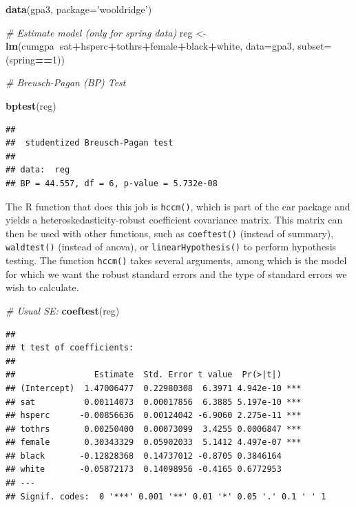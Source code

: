 \documentclass[]{book}
\newenvironment{Shaded}{\begin{snugshade}}{\end{snugshade}}
\newcommand{\CommentTok}[1]{\textcolor[rgb]{0.56,0.35,0.01}{\textit{#1}}}
\newcommand{\DataTypeTok}[1]{\textcolor[rgb]{0.13,0.29,0.53}{#1}}
\newcommand{\DecValTok}[1]{\textcolor[rgb]{0.00,0.00,0.81}{#1}}
\newcommand{\KeywordTok}[1]{\textcolor[rgb]{0.13,0.29,0.53}{\textbf{#1}}}
\newcommand{\NormalTok}[1]{#1}
\newcommand{\OperatorTok}[1]{\textcolor[rgb]{0.81,0.36,0.00}{\textbf{#1}}}
\newcommand{\StringTok}[1]{\textcolor[rgb]{0.31,0.60,0.02}{#1}}
\begin{document}
\begin{Shaded}
\begin{Highlighting}[]
\KeywordTok{data}\NormalTok{(gpa3, }\DataTypeTok{package=}\StringTok{'wooldridge'}\NormalTok{)}


\CommentTok{# Estimate model (only for spring data)}
\NormalTok{reg <-}\StringTok{ }\KeywordTok{lm}\NormalTok{(cumgpa}\OperatorTok{~}\NormalTok{sat}\OperatorTok{+}\NormalTok{hsperc}\OperatorTok{+}\NormalTok{tothrs}\OperatorTok{+}\NormalTok{female}\OperatorTok{+}\NormalTok{black}\OperatorTok{+}\NormalTok{white, }
          \DataTypeTok{data=}\NormalTok{gpa3, }\DataTypeTok{subset=}\NormalTok{(spring}\OperatorTok{==}\DecValTok{1}\NormalTok{))}


\CommentTok{# Breusch-Pagan (BP) Test}

\KeywordTok{bptest}\NormalTok{(reg)}
\end{Highlighting}
\end{Shaded}

\begin{verbatim}
## 
##  studentized Breusch-Pagan test
## 
## data:  reg
## BP = 44.557, df = 6, p-value = 5.732e-08
\end{verbatim}

The R function that does this job is \texttt{hccm()}, which is part of
the car package and yields a heteroskedasticity-robust coefficient
covariance matrix. This matrix can then be used with other functions,
such as \texttt{coeftest()} (instead of summary), \texttt{waldtest()}
(instead of anova), or \texttt{linearHypothesis()} to perform hypothesis
testing. The function \texttt{hccm()} takes several arguments, among
which is the model for which we want the robust standard errors and the
type of standard errors we wish to calculate.

\begin{Shaded}
\begin{Highlighting}[]
\CommentTok{# Usual SE:}
\KeywordTok{coeftest}\NormalTok{(reg)}
\end{Highlighting}
\end{Shaded}

\begin{verbatim}
## 
## t test of coefficients:
## 
##                Estimate  Std. Error t value  Pr(>|t|)    
## (Intercept)  1.47006477  0.22980308  6.3971 4.942e-10 ***
## sat          0.00114073  0.00017856  6.3885 5.197e-10 ***
## hsperc      -0.00856636  0.00124042 -6.9060 2.275e-11 ***
## tothrs       0.00250400  0.00073099  3.4255 0.0006847 ***
## female       0.30343329  0.05902033  5.1412 4.497e-07 ***
## black       -0.12828368  0.14737012 -0.8705 0.3846164    
## white       -0.05872173  0.14098956 -0.4165 0.6772953    
## ---
## Signif. codes:  0 '***' 0.001 '**' 0.01 '*' 0.05 '.' 0.1 ' ' 1
\end{verbatim}
\end{document}
